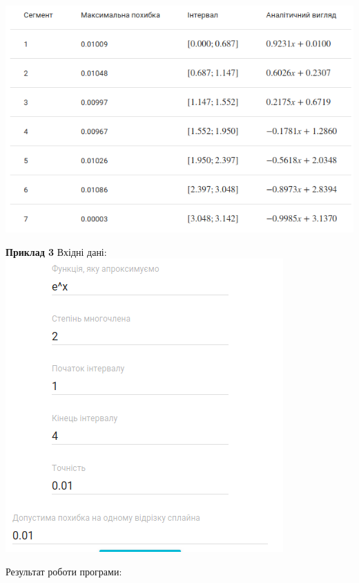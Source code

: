 \documentclass[ukrainian,14pt]{extarticle}
\begin{document}
\includegraphics[scale=0.7]{example2_table}

\newpage

\textbf{Приклад 3}
Вхідні дані:
\vspace{0.5cm}
\\
\includegraphics[scale=0.7]{example3_inputs}

\vspace{1cm}

Результат роботи програми:
\vspace{0.5cm}
\end{document}
